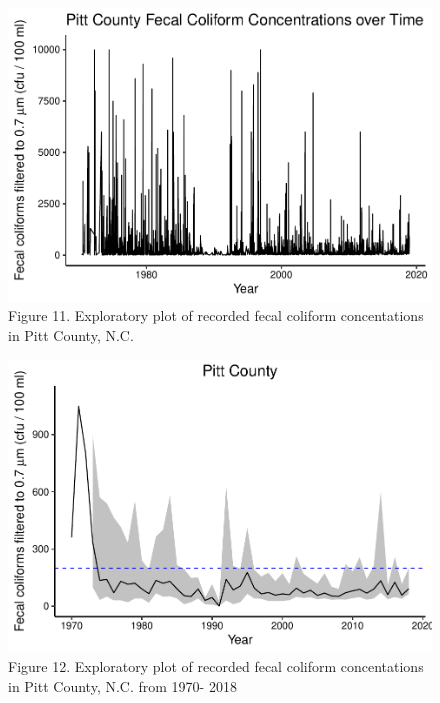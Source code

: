 \documentclass[12pt,]{article}
\begin{document}
\begin{figure}
\centering
\includegraphics{Edmondson_ENV872_Project_files/figure-latex/unnamed-chunk-10-1.pdf}
\caption{Figure 11. Exploratory plot of recorded fecal coliform
concentations in Pitt County, N.C.}
\end{figure}

\begin{figure}
\centering
\includegraphics{Edmondson_ENV872_Project_files/figure-latex/unnamed-chunk-11-1.pdf}
\caption{Figure 12. Exploratory plot of recorded fecal coliform
concentations in Pitt County, N.C. from 1970- 2018}
\end{figure}
\end{document}
